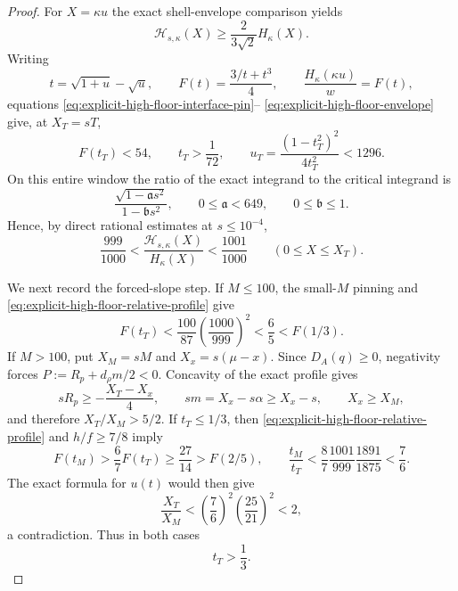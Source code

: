 \documentclass[11pt]{article}
\theoremstyle{remark}
\begin{document}
\begin{proof}
For $X=\kappa u$ the exact shell-envelope comparison yields
\begin{equation}
 \mathcal H_{s,\kappa}(X)\geq
 \frac{2}{3\sqrt2}H_\kappa(X).
 \label{eq:explicit-high-floor-envelope}
\end{equation}
Writing
\[
 t=\sqrt{1+u}-\sqrt u,\qquad
 F(t)=\frac{3/t+t^3}{4},\qquad
 \frac{H_\kappa(\kappa u)}w=F(t),
\]
equations \eqref{eq:explicit-high-floor-interface-pin}--
\eqref{eq:explicit-high-floor-envelope} give, at $X_T=sT$,
\begin{equation}
 F(t_T)<54,\qquad t_T>\frac1{72},\qquad
 u_T=\frac{(1-t_T^2)^2}{4t_T^2}<1296.
 \label{eq:explicit-high-floor-turning-window}
\end{equation}
On this entire window the ratio of the exact integrand to the critical
integrand is
\[
 \frac{\sqrt{1-\mathfrak a s^2}}{1-\mathfrak b s^2},\qquad
 0\leq\mathfrak a<649,\qquad0\leq\mathfrak b\leq1.
\]
Hence, by direct rational estimates at $s\leq10^{-4}$,
\begin{equation}
 \frac{999}{1000}<
 \frac{\mathcal H_{s,\kappa}(X)}{H_\kappa(X)}
 <\frac{1001}{1000}\qquad(0\leq X\leq X_T).
 \label{eq:explicit-high-floor-relative-profile}
\end{equation}

We next record the forced-slope step.  If $M\leq100$, the small-$M$
pinning and \eqref{eq:explicit-high-floor-relative-profile} give
\[
 F(t_T)<\frac{100}{87}\left(\frac{1000}{999}\right)^2
 <\frac65<F(1/3).
\]
If $M>100$, put $X_M=sM$ and $X_x=s(\mu-x)$.  Since
$D_A(q)\geq0$, negativity forces
$P:=R_p+d_\rho m/2<0$.  Concavity of the exact profile gives
\[
 sR_p\geq-\frac{X_T-X_x}{4},\qquad
 sm=X_x-s\alpha\geq X_x-s,\qquad X_x\geq X_M,
\]
and therefore $X_T/X_M>5/2$.  If $t_T\leq1/3$, then
\eqref{eq:explicit-high-floor-relative-profile} and $h/f\geq7/8$ imply
\[
 F(t_M)>\frac67F(t_T)\geq\frac{27}{14}>F(2/5),
 \qquad
 \frac{t_M}{t_T}<
 \frac87\frac{1001}{999}\frac{1891}{1875}<\frac76.
\]
The exact formula for $u(t)$ would then give
\[
 \frac{X_T}{X_M}<\left(\frac76\right)^2
 \left(\frac{25}{21}\right)^2<2,
\]
a contradiction.  Thus in both cases
\begin{equation}
 \boxed{t_T>\frac13.}
 \label{eq:explicit-high-floor-forced-slope}
\end{equation}


\end{proof}
\end{document}
